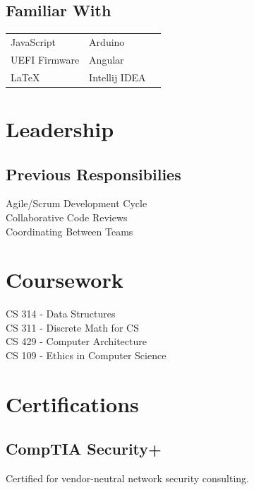 \documentclass[]{resume}
\begin{document}
\begin{minipage}[t]{0.33\textwidth}
\sectionsep
\subsection{Familiar With}
\begin{tabular}{lll}
\textbullet{} JavaScript & \textbullet{} Arduino \\
\textbullet{} UEFI Firmware & \textbullet{} Angular \\
\textbullet{} \LaTeX & \textbullet{} Intellij IDEA
\end{tabular}

\sectionsep
\vspace{20pt}


\section{Leadership}
\subsection{Previous Responsibilies}
\textbullet{} Agile/Scrum Development Cycle \\
\textbullet{} Collaborative Code Reviews \\ 
\textbullet{} Coordinating Between Teams
\vspace{20pt}
\sectionsep


\section{Coursework}
CS 314 - Data Structures \\
CS 311 - Discrete Math for CS \\
CS 429 - Computer Architecture \\
CS 109 - Ethics in Computer Science \\
\sectionsep
\vspace{20pt}


\section{Certifications}
\subsection{CompTIA Security+}
Certified for vendor-neutral network security consulting. \\
\sectionsep

%
%

\end{minipage} 
\end{document}

